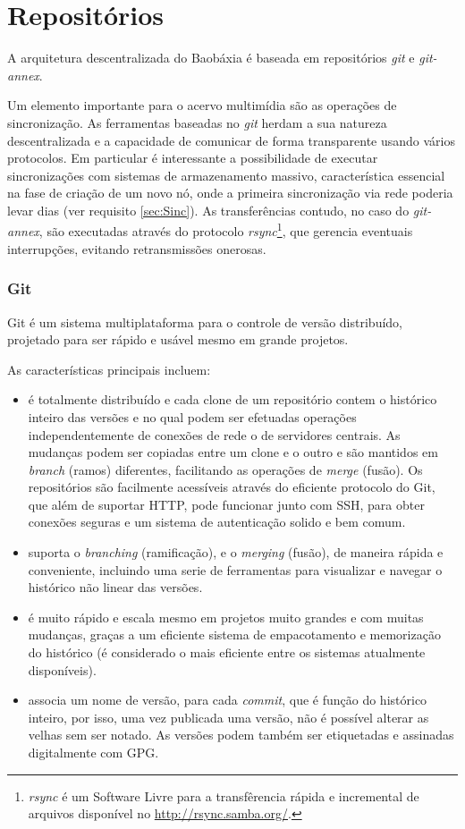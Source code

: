 \chapter{Repositórios}\label{Repositórios}\lhead{\leftmark}

A arquitetura descentralizada do Baobáxia é baseada em repositórios
\emph{git} e \emph{git-annex}.

Um elemento importante para o acervo multimídia são as operações de
sincronização. As ferramentas baseadas no \emph{git} herdam a sua
natureza descentralizada e a capacidade de comunicar de forma
transparente usando vários protocolos. Em particular é interessante a
possibilidade de executar sincronizações com sistemas de armazenamento
massivo, característica essencial na fase de criação de um novo nó,
onde a primeira sincronização via rede poderia levar dias (ver
requisito \ref{sec:Sinc}). As transferências contudo, no caso do
\emph{git-annex}, são executadas através do protocolo
\emph{rsync}\footnote{\emph{rsync} é um Software Livre para a
  transfêrencia rápida e incremental de arquivos disponível no
  \url{http://rsync.samba.org/}.}, que gerencia eventuais
interrupções, evitando retransmissões onerosas.


\subsection{Git}\label{sec:GIT}
Git é um sistema multiplataforma para o controle de versão
distribuído, projetado para ser rápido e usável mesmo em grande
projetos.

As características principais incluem:
\begin{itemize}
\item é totalmente distribuído e cada clone de um repositório contem o
  histórico inteiro das versões e no qual podem ser efetuadas
  operações independentemente de conexões de rede o de servidores
  centrais. As mudanças podem ser copiadas entre um clone e o outro e
  são mantidos em \emph{branch} (ramos) diferentes, facilitando as
  operações de \emph{merge} (fusão). Os repositórios são facilmente
  acessíveis através do eficiente protocolo do Git, que além de
  suportar HTTP, pode funcionar junto com SSH, para obter conexões
  seguras e um sistema de autenticação solido e bem comum.
\item suporta o \emph{branching} (ramificação), e o \emph{merging}
  (fusão), de maneira rápida e conveniente, incluindo uma serie de
  ferramentas para visualizar e navegar o histórico não linear das
  versões.
\item é muito rápido e escala mesmo em projetos muito grandes e com
  muitas mudanças, graças a um eficiente sistema de empacotamento e
  memorização do histórico (é considerado o mais eficiente entre os
  sistemas atualmente disponíveis).
\item associa um nome de versão, para cada \emph{commit}, que é função
  do histórico inteiro, por isso, uma vez publicada uma versão, não é
  possível alterar as velhas sem ser notado. As versões podem também
  ser etiquetadas e assinadas digitalmente com GPG.
\end{itemize}

